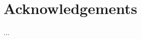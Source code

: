 \documentclass[12pt,twoside]{report}
\begin{document}
\chapter*{Acknowledgements}
...

\tableofcontents


{}
{}
{}
{}
{}
{}
{}
{}
{}
{}



\end{document}
